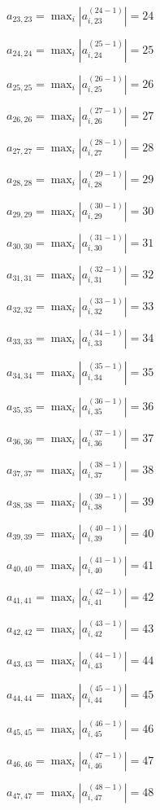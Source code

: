 \documentclass[a4paper,12pt]{article}
\begin{document}
$a _{ 23, 23 } =  \max _i |a _{ i, 23 } ^{ (24 - 1) } | = 24$

$a _{ 24, 24 } =  \max _i |a _{ i, 24 } ^{ (25 - 1) } | = 25$

$a _{ 25, 25 } =  \max _i |a _{ i, 25 } ^{ (26 - 1) } | = 26$

$a _{ 26, 26 } =  \max _i |a _{ i, 26 } ^{ (27 - 1) } | = 27$

$a _{ 27, 27 } =  \max _i |a _{ i, 27 } ^{ (28 - 1) } | = 28$

$a _{ 28, 28 } =  \max _i |a _{ i, 28 } ^{ (29 - 1) } | = 29$

$a _{ 29, 29 } =  \max _i |a _{ i, 29 } ^{ (30 - 1) } | = 30$

$a _{ 30, 30 } =  \max _i |a _{ i, 30 } ^{ (31 - 1) } | = 31$

$a _{ 31, 31 } =  \max _i |a _{ i, 31 } ^{ (32 - 1) } | = 32$

$a _{ 32, 32 } =  \max _i |a _{ i, 32 } ^{ (33 - 1) } | = 33$

$a _{ 33, 33 } =  \max _i |a _{ i, 33 } ^{ (34 - 1) } | = 34$

$a _{ 34, 34 } =  \max _i |a _{ i, 34 } ^{ (35 - 1) } | = 35$

$a _{ 35, 35 } =  \max _i |a _{ i, 35 } ^{ (36 - 1) } | = 36$

$a _{ 36, 36 } =  \max _i |a _{ i, 36 } ^{ (37 - 1) } | = 37$

$a _{ 37, 37 } =  \max _i |a _{ i, 37 } ^{ (38 - 1) } | = 38$

$a _{ 38, 38 } =  \max _i |a _{ i, 38 } ^{ (39 - 1) } | = 39$

$a _{ 39, 39 } =  \max _i |a _{ i, 39 } ^{ (40 - 1) } | = 40$

$a _{ 40, 40 } =  \max _i |a _{ i, 40 } ^{ (41 - 1) } | = 41$

$a _{ 41, 41 } =  \max _i |a _{ i, 41 } ^{ (42 - 1) } | = 42$

$a _{ 42, 42 } =  \max _i |a _{ i, 42 } ^{ (43 - 1) } | = 43$

$a _{ 43, 43 } =  \max _i |a _{ i, 43 } ^{ (44 - 1) } | = 44$

$a _{ 44, 44 } =  \max _i |a _{ i, 44 } ^{ (45 - 1) } | = 45$

$a _{ 45, 45 } =  \max _i |a _{ i, 45 } ^{ (46 - 1) } | = 46$

$a _{ 46, 46 } =  \max _i |a _{ i, 46 } ^{ (47 - 1) } | = 47$

$a _{ 47, 47 } =  \max _i |a _{ i, 47 } ^{ (48 - 1) } | = 48$
\end{document}
